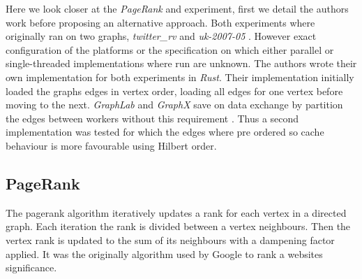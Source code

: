 Here we look closer at the \textit{PageRank} and  experiment, first we detail the authors work before proposing an alternative approach. Both experiments where originally ran on two graphs, \textit{twitter\_rv} \cite{twitter} and \textit{uk-2007-05} \cite{uk2007}. However exact configuration of the platforms or the specification on which either parallel or single-threaded implementations where run are unknown. 
The authors wrote their own implementation for both experiments in \textit{Rust}. Their implementation initially loaded the graphs edges in vertex order, loading all edges for one vertex before moving to the next. \textit{GraphLab} and \textit{GraphX} save on data exchange by partition the edges between workers without this requirement \cite{graphlab,graphx}. Thus a second implementation was tested for which the edges where pre ordered so cache behaviour is more favourable using Hilbert order.

\subsection{PageRank}
The pagerank algorithm iteratively updates a rank for each vertex in a directed graph. Each iteration the rank is divided between a vertex neighbours. Then the vertex rank is updated to the sum of its neighbours with a dampening factor applied. It was the originally algorithm used by Google to rank a websites significance.

